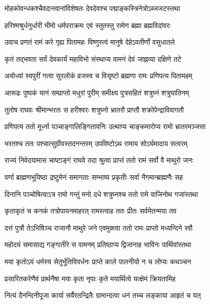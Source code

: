 \twolineshloka
{मोहकोवन्धकश्चैवदानवानांविशेषतः}
{देवदेवश्च पद्माङ्कस्त्रिनेत्रोऽब्जजटस्तथा}%

\twolineshloka
{हरिश्मश्रुर्धनुर्धारी भीमो धर्मपराक्रमः}
{एवं स्तुतस्तु रामेण ब्रह्मा ब्रह्मविदांवरः}%

\twolineshloka
{उवाच प्रणतं रामं करे गृह्य पितामहः}
{विष्णुस्त्वं मानुषे देहेऽवतीर्णो वसुधातले}%

\twolineshloka
{कृतं तद्भवता सर्वं देवकार्यं महाविभो}
{संस्थाप्य वामनं देवं जाह्नव्या दक्षिणे तटे}%

\twolineshloka
{अयोध्यां स्वपुरीं गत्वा सुरलोकं व्रजस्व च}
{विसृष्टो ब्रह्मणा रामः प्रणिपत्य पितामहम्}%

\twolineshloka
{आरूढः पुष्पकं यानं सम्प्राप्तो मधुरां पुरीम्}
{समीक्ष्य पुत्रसहितं शत्रुघ्नं शत्रुघातिनम्}%

\twolineshloka
{तुतोष राघवः श्रीमान्भरतः स हरीश्वरः}
{शत्रुघ्नो भ्रातरौ प्राप्तौ शक्रोपेन्द्राविवागतौ}%

\twolineshloka
{प्रणिपत्य ततो मूर्ध्ना पञ्चाङ्गालिङ्गितावनिः}
{उत्थाप्य चाङ्कमारोप्य रामो भ्रातरमञ्जसा}%

\twolineshloka
{भरतश्च ततः पश्चात्सुग्रीवस्तदनन्तरम्}
{उपविष्टोऽथ रामाय सोऽर्घमादाय सत्वरम्}%

\twolineshloka
{राज्यं निवेदयामास चाष्टाङ्गं राघवे तदा}
{श्रुत्वा प्राप्तं ततो रामं सर्वो वै माथुरो जनः}%

\twolineshloka
{वर्णा ब्राह्मणभूयिष्ठा द्रष्टुमेनं समागताः}
{सम्भाष्य प्रकृतीः सर्वा नैगमान्ब्राह्मणैः सह}%

\twolineshloka
{दिनानि पञ्चोषित्वाऽत्र रामो गन्तुं मनो दधे}
{शत्रुघ्नश्च ततो रामे वाजिनोथ गजांस्तथा}%

\twolineshloka
{कृताकृतं च कनकं तत्रोपायनमाहरत्}
{रामस्त्वाह ततः प्रीतः सर्वमेतन्मया तव}%

\twolineshloka
{दत्तं पुत्रौ तेऽभिषिञ्च राजानौ माथुरे जने}
{एवमुक्त्वा ततो रामः प्राप्तो मध्यन्दिने रवौ}%

\twolineshloka
{महोदयं समासाद्य गङ्गातीरे स वामनम्}
{प्रतिष्ठाप्य द्विजानाह भाविनः पार्थिवांस्तथा}%

\twolineshloka
{मया कृतोऽयं धर्मस्य सेतुर्भूतिविवर्धनः}
{प्राप्ते काले पालनीयो न च लोप्यः कथञ्चन}%

\twolineshloka
{प्रसारितकरेणैवं प्रार्थनैषा मया कृता}
{नृपाः कृते मयार्थित्वे यत्क्षेमं क्रियतामिह}%

\twolineshloka
{नित्यं दैनन्दिनीपूजा कार्या सर्वैरतन्द्रितैः}
{ग्रामान्दत्वा धनं तच्च लङ्काया आहृतं च यत्}%

